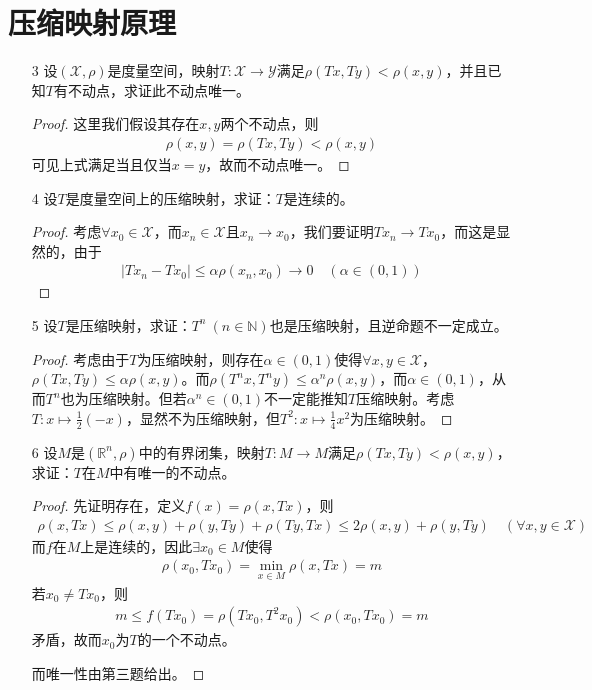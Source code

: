 	\section{压缩映射原理}
	\begin{enumerate}[leftmargin=2cm, label=\arabic*]
		\item[3] 设$(\mathscr{X},\rho)$是度量空间，映射$T:\mathscr{X}\to\mathscr{Y}$满足$\rho(Tx,Ty) < \rho(x,y)$，并且已知$T$有不动点，求证此不动点唯一。
		\begin{proof}
			这里我们假设其存在$x,y$两个不动点，则
			\begin{align*}
				\rho(x,y) = \rho(Tx,Ty) < \rho(x,y) 
			\end{align*}
			可见上式满足当且仅当$x = y$，故而不动点唯一。
		\end{proof}
		
		\item[4] 设$T$是度量空间上的压缩映射，求证：$T$是连续的。
		\begin{proof}
			考虑$\forall x_0\in\mathscr{X}$，而$x_n\in\mathscr{X}$且$x_n\to x_0$，我们要证明$Tx_n \to Tx_0$，而这是显然的，由于
			\begin{align*}
				|Tx_n - Tx_0| \leqslant \alpha \rho(x_n,x_0) \to 0 \quad (\alpha\in (0,1))
			\end{align*}
		\end{proof}
		
		\item[5] 设$T$是压缩映射，求证：$T^n\ (n\in\mathbb{N})$也是压缩映射，且逆命题不一定成立。  
		\begin{proof}
			考虑由于$T$为压缩映射，则存在$\alpha\in (0,1)$使得$\forall x,y\in\mathscr{X}$，$\rho(Tx,Ty) \leqslant \alpha\rho(x,y)$。而$\rho(T^nx,T^ny) \leqslant \alpha^n \rho(x,y)$，而$\alpha\in(0,1)$，从而$T^n$也为压缩映射。但若$\alpha^n\in (0,1)$不一定能推知$T$压缩映射。考虑$T:x\mapsto \frac{1}{2}(-x)$，显然不为压缩映射，但$T^2:x\mapsto \frac{1}{4}x^2$为压缩映射。
		\end{proof}
		
		\item[6] 设$M$是$(\mathbb{R}^n,\rho)$中的有界闭集，映射$T:M\to M$满足$\rho(Tx,Ty) < \rho(x,y)$，求证：$T$在$M$中有唯一的不动点。
		\begin{proof}
			先证明存在，定义$f(x) = \rho(x,Tx)$，则
			\begin{align*}
				\rho(x,Tx) \leqslant \rho(x,y) + \rho(y,Ty) + \rho(Ty, Tx) \leqslant 2\rho(x,y) + \rho(y, Ty) \quad (\forall x,y\in\mathscr{X})
			\end{align*}
			而$f$在$M$上是连续的，因此$\exists x_0\in M$使得
			\begin{align*}
				\rho(x_0, Tx_0) = \min\limits_{x\in M} \rho(x, Tx) = m
			\end{align*}
			若$x_0 \neq Tx_0$，则
			\begin{align*}
				m \leqslant f(Tx_0) = \rho(Tx_0, T^2x_0) < \rho(x_0, Tx_0) = m
			\end{align*}
			矛盾，故而$x_0$为$T$的一个不动点。
			
			而唯一性由第三题给出。
		\end{proof}
	\end{enumerate}
	
